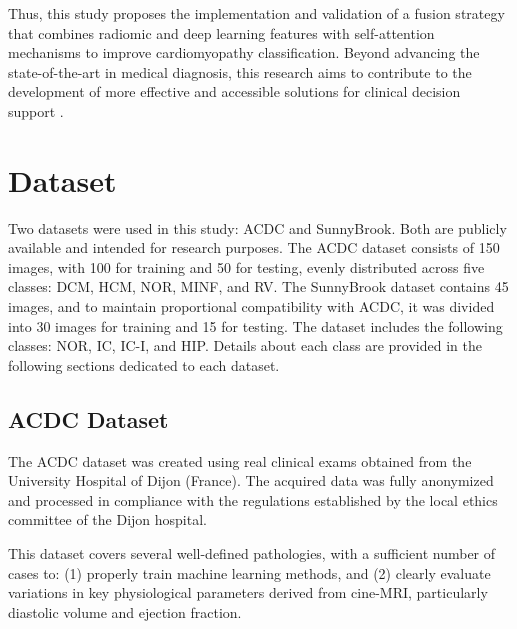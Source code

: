 \documentclass[journal,twoside,web]{ieeecolor}
\begin{document}
Thus, this study proposes the implementation and validation of a fusion strategy that combines radiomic and deep learning features with self-attention mechanisms to improve cardiomyopathy classification. Beyond advancing the state-of-the-art in medical diagnosis, this research aims to contribute to the development of more effective and accessible solutions for clinical decision support \cite{brielerCardiomyopathyOverview2017}.



\section{Dataset}
Two datasets were used in this study: ACDC and SunnyBrook. Both are publicly available and intended for research purposes. The ACDC dataset consists of 150 images, with 100 for training and 50 for testing, evenly distributed across five classes: DCM, HCM, NOR, MINF, and RV. The SunnyBrook dataset contains 45 images, and to maintain proportional compatibility with ACDC, it was divided into 30 images for training and 15 for testing. The dataset includes the following classes: NOR, IC, IC-I, and HIP. Details about each class are provided in the following sections dedicated to each dataset.

\subsection{ACDC Dataset}
The ACDC dataset was created using real clinical exams obtained from the University Hospital of Dijon (France). The acquired data was fully anonymized and processed in compliance with the regulations established by the local ethics committee of the Dijon hospital.  

This dataset covers several well-defined pathologies, with a sufficient number of cases to: (1) properly train machine learning methods, and  
(2) clearly evaluate variations in key physiological parameters derived from cine-MRI, particularly diastolic volume and ejection fraction.  
\end{document}
